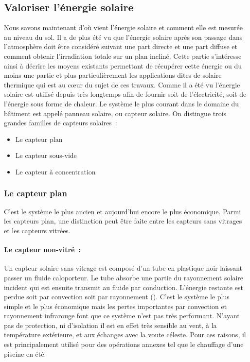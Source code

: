 \subsection{Valoriser l’énergie solaire} %
\label{sub:valoriser_l_energie_solaire}
Nous savons maintenant d’où vient l’énergie solaire et comment elle est mesurée au niveau
du sol. Il a de plus été vu que l’énergie solaire après son passage dans l’atmosphère doit
être considéré suivant une part directe et une part diffuse et comment obtenir
l’irradiation totale sur un plan incliné. Cette partie s’intéresse ainsi à décrire les
moyens existants permettant de récupérer cette énergie ou du moins une partie et plus
particulièrement les applications dites de solaire thermique qui est au cœur du sujet de
ces travaux. Comme il a été vu l’énergie solaire est utilisé depuis très longtemps afin de
fournir soit de l’électricité, soit de l’énergie sous forme de chaleur. Le système le plus
courant dans le domaine du bâtiment est appelé panneau solaire, ou capteur solaire. On
distingue trois grandes familles de capteurs solaires~:
\begin{itemize}
    \item Le capteur plan
    \item Le capteur sous-vide
    \item Le capteur à concentration
\end{itemize}


\subsubsection{Le capteur plan} %
\label{ssub:le_capteur_plan}
C’est le système le plus ancien et aujourd’hui encore le plus économique. Parmi les
capteurs plan, une distinction peut être faite entre les capteurs sans vitrages
et les capteurs vitrées.

\paragraph{Le capteur non-vitré~:} %
\label{par:le_capteur_non_vitre}
Un capteur solaire sans vitrage est composé d’un tube en plastique noir laissant passer un
fluide caloporteur. Le tube absorbe une partie du rayonnement solaire incident qui est
ensuite transmit au fluide par conduction. L’énergie restante est perdue soit par
convection soit par rayonnement (). C’est le système le plus
simple et le plus économique mais les pertes importantes par convection et rayonnement
infrarouge font que ce système n’est pas très performant. N’ayant pas de protection, ni
d’isolation il est en effet très sensible au vent, à la température extérieure, et aux
échanges avec la voute céleste. Pour ces raisons, il est principalement utilisé pour des
opérations annexes tel que le chauffage d’une piscine en été.

